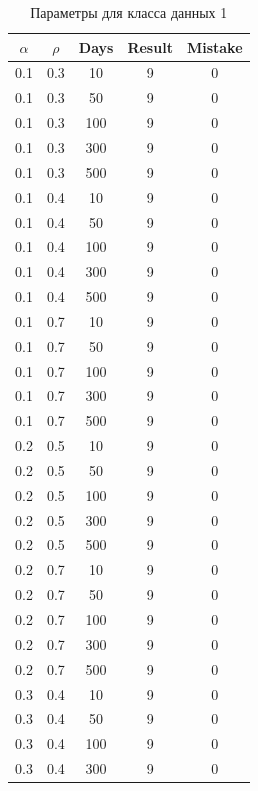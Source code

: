 \begin{center}
	\captionsetup{justification=raggedright,singlelinecheck=off}
	\begin{longtable}[c]{|c|c|c|c|c|}
		\caption{Параметры для класса данных 1\label{tbl:table_kd1}}\\ \hline
		$\alpha$ & $\rho$ & Days & Result & Mistake \\ \hline
		0.1 & 0.3 &  10 &    9 &    0 \\
		0.1 & 0.3 &  50 &    9 &    0 \\
		0.1 & 0.3 & 100 &    9 &    0 \\
		0.1 & 0.3 & 300 &    9 &    0 \\
		0.1 & 0.3 & 500 &    9 &    0 \\ \hline
		0.1 & 0.4 &  10 &    9 &    0 \\
		0.1 & 0.4 &  50 &    9 &    0 \\
		0.1 & 0.4 & 100 &    9 &    0 \\
		0.1 & 0.4 & 300 &    9 &    0 \\
		0.1 & 0.4 & 500 &    9 &    0 \\ \hline
		0.1 & 0.7 &  10 &    9 &    0 \\
		0.1 & 0.7 &  50 &    9 &    0 \\
		0.1 & 0.7 & 100 &    9 &    0 \\
		0.1 & 0.7 & 300 &    9 &    0 \\
		0.1 & 0.7 & 500 &    9 &    0 \\ \hline
		0.2 & 0.5 &  10 &    9 &    0 \\
		0.2 & 0.5 &  50 &    9 &    0 \\
		0.2 & 0.5 & 100 &    9 &    0 \\
		0.2 & 0.5 & 300 &    9 &    0 \\
		0.2 & 0.5 & 500 &    9 &    0 \\ \hline
		0.2 & 0.7 &  10 &    9 &    0 \\
		0.2 & 0.7 &  50 &    9 &    0 \\
		0.2 & 0.7 & 100 &    9 &    0 \\
		0.2 & 0.7 & 300 &    9 &    0 \\
		0.2 & 0.7 & 500 &    9 &    0 \\ \hline
		0.3 & 0.4 &  10 &    9 &    0 \\
		0.3 & 0.4 &  50 &    9 &    0 \\
		0.3 & 0.4 & 100 &    9 &    0 \\
		0.3 & 0.4 & 300 &    9 &    0 \\

\end{longtable}
\end{center}
